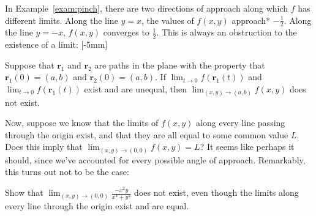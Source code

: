 \documentclass[svgnames]{watsonbook}
\begin{document}
In Example~\ref{exam:pinch}, there are two directions of approach
along which $f$ has different limits. Along the line $y = x$, the
values of $f(x,y)$ approach* $-\tfrac{1}{2}$. Along the line $y = -x$,
$f(x,y)$ converges to $\tfrac{1}{2}$. This is always an obstruction to
the existence of a limit: [-5mm]

\begin{exercise}{}{}
  Suppose that $\mathbf{r}_1$ and $\mathbf{r}_2$ are paths in the
  plane with the property that $\mathbf{r}_1(0) = (a,b)$ and
  $\mathbf{r}_2(0) = (a,b)$. If $\lim_{t \to 0}f(\mathbf{r}_1(t))$ and
  $\lim_{t \to 0}f(\mathbf{r}_1(t))$ exist and are unequal, then
  $\displaystyle{\lim_{(x,y) \to (a,b)} f(x,y)}$ does not exist. 
\end{exercise}

Now, suppose we know that the limits of $f(x,y)$ along every line
passing through the origin exist, and that they are all equal to some
common value $L$. Does
this imply that $\lim_{(x,y) \to (0,0)}f(x,y) = L$? It seems like
perhaps it should, since we've accounted for every possible angle of
approach. Remarkably, this turns out not to be the case:

\begin{example}{}{}
  Show that $\lim_{(x,y) \to (0,0)}\frac{-x^2 y }{x^4 + y^2}$ does not
  exist, even though the limits along every line through the origin
  exist and are equal. 
\end{example}
\end{document}
